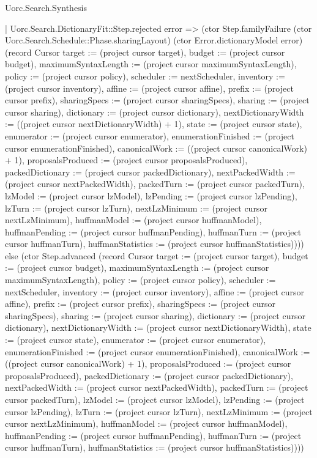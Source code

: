 \begin{lexlean}{Uorc.Search.Synthesis}
\begin{semanticmodule}
{      | Uorc.Search.DictionaryFit::Step.rejected error => (ctor Step.familyFailure (ctor Uorc.Search.Schedule::Phase.sharingLayout) (ctor Error.dictionaryModel error) (record Cursor {target := (project cursor target), budget := (project cursor budget), maximumSyntaxLength := (project cursor maximumSyntaxLength), policy := (project cursor policy), scheduler := nextScheduler, inventory := (project cursor inventory), affine := (project cursor affine), prefix := (project cursor prefix), sharingSpecs := (project cursor sharingSpecs), sharing := (project cursor sharing), dictionary := (project cursor dictionary), nextDictionaryWidth := ((project cursor nextDictionaryWidth) + 1), state := (project cursor state), enumerator := (project cursor enumerator), enumerationFinished := (project cursor enumerationFinished), canonicalWork := ((project cursor canonicalWork) + 1), proposalsProduced := (project cursor proposalsProduced), packedDictionary := (project cursor packedDictionary), nextPackedWidth := (project cursor nextPackedWidth), packedTurn := (project cursor packedTurn), lzModel := (project cursor lzModel), lzPending := (project cursor lzPending), lzTurn := (project cursor lzTurn), nextLzMinimum := (project cursor nextLzMinimum), huffmanModel := (project cursor huffmanModel), huffmanPending := (project cursor huffmanPending), huffmanTurn := (project cursor huffmanTurn), huffmanStatistics := (project cursor huffmanStatistics)}))) else (ctor Step.advanced (record Cursor {target := (project cursor target), budget := (project cursor budget), maximumSyntaxLength := (project cursor maximumSyntaxLength), policy := (project cursor policy), scheduler := nextScheduler, inventory := (project cursor inventory), affine := (project cursor affine), prefix := (project cursor prefix), sharingSpecs := (project cursor sharingSpecs), sharing := (project cursor sharing), dictionary := (project cursor dictionary), nextDictionaryWidth := (project cursor nextDictionaryWidth), state := (project cursor state), enumerator := (project cursor enumerator), enumerationFinished := (project cursor enumerationFinished), canonicalWork := ((project cursor canonicalWork) + 1), proposalsProduced := (project cursor proposalsProduced), packedDictionary := (project cursor packedDictionary), nextPackedWidth := (project cursor nextPackedWidth), packedTurn := (project cursor packedTurn), lzModel := (project cursor lzModel), lzPending := (project cursor lzPending), lzTurn := (project cursor lzTurn), nextLzMinimum := (project cursor nextLzMinimum), huffmanModel := (project cursor huffmanModel), huffmanPending := (project cursor huffmanPending), huffmanTurn := (project cursor huffmanTurn), huffmanStatistics := (project cursor huffmanStatistics)})))
}
\end{semanticmodule}
\end{lexlean}
